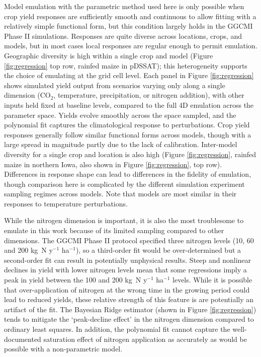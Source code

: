 \documentclass[gmd, manuscript]{copernicus} %
\begin{document}
Model emulation with the parametric method used here is only possible when crop yield responses are sufficiently smooth and continuous to allow fitting with a relatively simple functional form, but this condition largely holds in the GGCMI Phase II simulations. 
Responses are quite diverse across locations, crops, and models, but in most cases local responses are regular enough to permit emulation. 
Geographic diversity is high within a single crop and model (Figure \ref{fig:regression} top row, rainfed maize in pDSSAT); this heterogeneity supports the choice of emulating at the grid cell level. 
Each panel in Figure \ref{fig:regression} shows simulated yield output from scenarios varying only along a single dimension (CO$_2$, temperature, precipitation, or nitrogen addition), with other inputs held fixed at baseline levels, compared to the full 4D emulation across the parameter space. 
Yields evolve smoothly across the space sampled, and the polynomial fit captures the climatological response to perturbations. 
Crop yield responses generally follow similar functional forms across models, though with a large spread in magnitude partly due to the lack of calibration. 
Inter-model diversity for a single crop and location is also high (Figure \ref{fig:regression}, rainfed maize in northern Iowa, also shown in Figure \ref{fig:regression}, top row). 
Differences in response shape can lead to  differences in the fidelity of emulation, though comparison here is complicated by the different simulation experiment sampling regimes across models. 
Note that models are most similar in their responses to temperature perturbations. 

While the nitrogen dimension is important, it is also the most troublesome to emulate in this work because of its limited sampling compared to other dimensions. 
The GGCMI Phase II protocol specified three nitrogen levels (10, 60 and 200 kg~N y$^{-1}$ ha$^{-1}$), so a third-order fit would be over-determined but a second-order fit can result in potentially unphysical results. 
Steep and nonlinear declines in yield with lower nitrogen levels mean that some regressions imply a peak in yield between the 100 and 200 kg~N y$^{-1}$ ha$^{-1}$ levels. 
While it is possible that over-application of nitrogen at the wrong time in the growing period could lead to reduced yields, these relative strength of this feature is are potentially an artifact of the fit. 
The Bayesian Ridge estimator (shown in Figure \ref{fig:regression}) tends to mitigate the `peak-decline effect' in the nitrogen dimension compared to ordinary least squares. 
In addition, the polynomial fit cannot capture the well-documented saturation effect of nitrogen application \citep[e.g.][]{Torsten77} as accurately as would be possible with a non-parametric model. 
\end{document}
